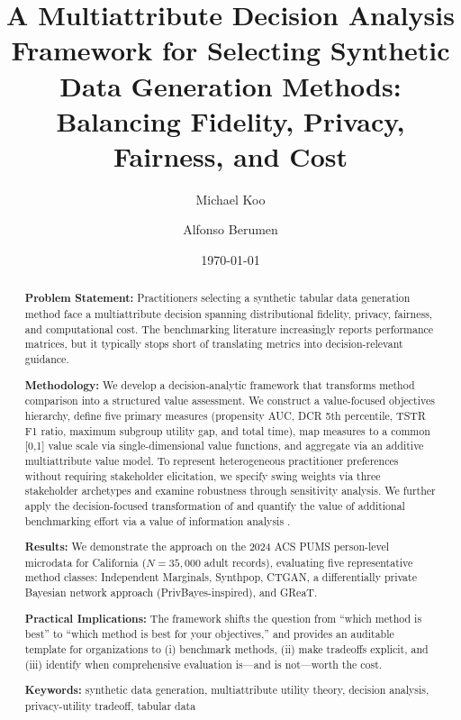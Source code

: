 \documentclass[12pt,a4paper]{article}
\title{\textbf{A Multiattribute Decision Analysis Framework for Selecting Synthetic Data Generation Methods: Balancing Fidelity, Privacy, Fairness, and Cost}}
\author{Michael Koo \and Alfonso Berumen}
\date{\today}
\begin{document}
\maketitle

\begin{abstract}
\noindent\textbf{Problem Statement:} Practitioners selecting a synthetic tabular data generation method face a multiattribute decision spanning distributional fidelity, privacy, fairness, and computational cost. The benchmarking literature increasingly reports performance matrices, but it typically stops short of translating metrics into decision-relevant guidance.

\noindent\textbf{Methodology:} We develop a decision-analytic framework that transforms method comparison into a structured value assessment. We construct a value-focused objectives hierarchy, define five primary measures (propensity AUC, DCR 5th percentile, TSTR F1 ratio, maximum subgroup utility gap, and total time), map measures to a common [0,1] value scale via single-dimensional value functions, and aggregate via an additive multiattribute value model. To represent heterogeneous practitioner preferences without requiring stakeholder elicitation, we specify swing weights via three stakeholder archetypes and examine robustness through sensitivity analysis. We further apply the decision-focused transformation of \citet{dees2010decision} and quantify the value of additional benchmarking effort via a value of information analysis \citep{keisler2004value}.

\noindent\textbf{Results:} We demonstrate the approach on the 2024 ACS PUMS person-level microdata for California ($N=35{,}000$ adult records), evaluating five representative method classes: Independent Marginals, Synthpop, CTGAN, a differentially private Bayesian network approach (PrivBayes-inspired), and GReaT.

\noindent\textbf{Practical Implications:} The framework shifts the question from ``which method is best'' to ``which method is best for your objectives,'' and provides an auditable template for organizations to (i) benchmark methods, (ii) make tradeoffs explicit, and (iii) identify when comprehensive evaluation is---and is not---worth the cost.

\vspace{0.5em}
\noindent\textbf{Keywords:} synthetic data generation, multiattribute utility theory, decision analysis, privacy-utility tradeoff, tabular data
\end{abstract}
\end{document}
